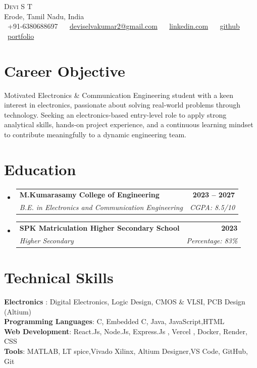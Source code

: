\documentclass[letterpaper,11pt]{article}
\makeatletter
\newcommand{\resumeSubheading}[4]{
  \vspace{-2pt}\item
  \begin{tabular*}{1.0\textwidth}[t]{l@{\extracolsep{\fill}}r}
    \textbf{#1} & \textbf{\small #2} \\
    \textit{\small#3} & \textit{\small #4} \\
  \end{tabular*}\vspace{-7pt}
}
\newcommand{\resumeSubHeadingListStart}{\begin{itemize}[leftmargin=0.0in, label={}]}
\newcommand{\resumeSubHeadingListEnd}{\end{itemize}}
\makeatother
\begin{document}
\begin{center}
    {\Huge \scshape Devi S T} \\ \vspace{1pt}
    Erode, Tamil Nadu, India \\ \vspace{1pt}
    \small
    \faPhone\ +91-6380688697 ~
    \faEnvelope\ \href{mailto:deviselvakumar2@gmail.com}{deviselvakumar2@gmail.com} ~
    \faLinkedin\ \href{https://www.linkedin.com/in/devi-selvakumar}{linkedin.com} ~
    \faGithub\ \href{https://github.com/Git-by-Devi}{github}
    \faGlobe\ \href{https://personal-portfolio-sand-six-18.vercel.app/}{portfolio}
    \vspace{-8pt}
\end{center}

\section{Career Objective}
\small{
Motivated Electronics \& Communication Engineering student with a keen interest in electronics, passionate about solving real-world problems through technology. Seeking an electronics-based entry-level role to apply strong analytical skills, hands-on project experience, and a continuous learning mindset to contribute meaningfully to a dynamic engineering team.
}

\section{Education}
\resumeSubHeadingListStart
  \resumeSubheading
    {M.Kumarasamy College of Engineering}{2023 -- 2027}
    {B.E. in Electronics and Communication Engineering}{CGPA: 8.5/10}
  \resumeSubheading
    {SPK Matriculation Higher Secondary School}{2023}
    {Higher Secondary}{Percentage: 83\%}
\resumeSubHeadingListEnd

\section{Technical Skills}
\begin{itemize}[leftmargin=0.15in, label={}]
  \small{\item{
    \textbf{Electronics }{: Digital Electronics, Logic Design, CMOS \& VLSI, PCB Design (Altium)} \\
    \textbf{Programming Languages}{: C, Embedded C, Java, JavaScript,HTML } \\
    \textbf{Web Development}{: React.Js, Node.Js, Express.Js , Vercel , Docker, Render, CSS } \\
    \textbf{Tools}{: MATLAB, LT spice,Vivado Xilinx, Altium Designer,VS Code, GitHub, Git} \\
  }}
\end{itemize}
\end{document}
